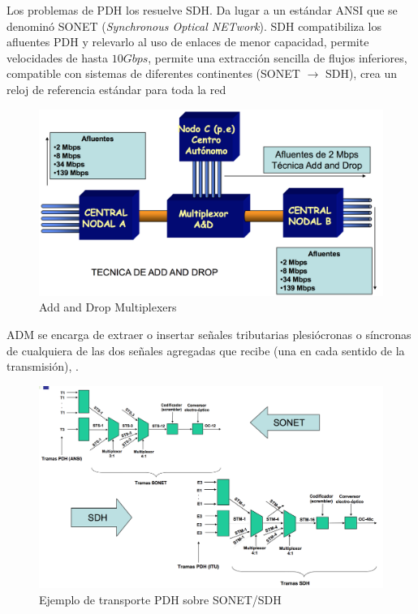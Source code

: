 \documentclass[10pt,portrait, twocolumn]{article}
\makeatletter
\renewcommand{\subsubsection}{\@startsection{subsubsection}{3}{0mm}%
                                {-1ex plus -.5ex minus -.2ex}%
                                {1ex plus .2ex}%
                                {\normalfont\small\bfseries}}
\makeatother
\begin{document}
Los problemas de PDH los resuelve SDH. Da lugar a un estándar ANSI que se denominó SONET (\textit{Synchronous Optical NETwork}). SDH compatibiliza los afluentes PDH y relevarlo al uso de enlaces de menor capacidad, permite velocidades de hasta $10 Gbps$, permite una extracción sencilla de flujos inferiores, compatible con sistemas de diferentes continentes (SONET $\rightarrow$ SDH), crea un reloj de referencia estándar para toda la red


	\begin{figure}[!ht]
 		\centering
  		 \includegraphics[scale = 0.3]{images/AddDrop}
		\caption{Add and Drop Multiplexers}
	\end{figure}

ADM se encarga de extraer o insertar señales tributarias plesiócronas o síncronas de cualquiera de las dos señales agregadas que recibe (una en cada sentido de la transmisión), .



	
	\begin{figure}[!ht]
 		\centering
  		 \includegraphics[scale = 0.4]{images/EjemploTrans}
		\caption{Ejemplo de transporte PDH sobre SONET/SDH}
	\end{figure}
\end{document}
